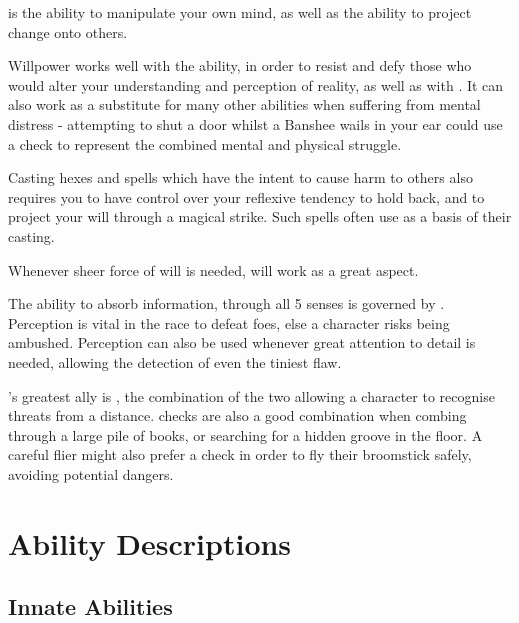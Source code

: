 

 is the ability to manipulate your own mind, as well as the ability to project change onto others. 

Willpower works well with the  ability, in order to resist and defy those who would alter your understanding and perception of reality, as well as with . It can also work as a substitute for many other abilities when suffering from mental distress - attempting to shut a door whilst a Banshee wails in your ear could use a  check to represent the combined mental and physical struggle. 

Casting hexes and spells which have the intent to cause harm to others also requires you to have control over your reflexive tendency to hold back, and to project your will through a magical strike. Such spells often use  as a basis of their casting.  

Whenever sheer force of will is needed,  will work as a great aspect. 




The ability to absorb information, through all 5 senses is governed by . Perception is vital in the race to defeat foes, else a character risks being ambushed. Perception can also be used whenever great attention to detail is needed, allowing the detection of even the tiniest flaw.  

's greatest ally is , the combination of the two allowing a character to recognise threats from a distance.  checks are also a good combination when combing through a large pile of books, or searching for a hidden groove in the floor. A careful flier might also prefer a  check in order to fly their broomstick safely, avoiding potential dangers.


\section{Ability Descriptions}

\subsection{Innate Abilities}

